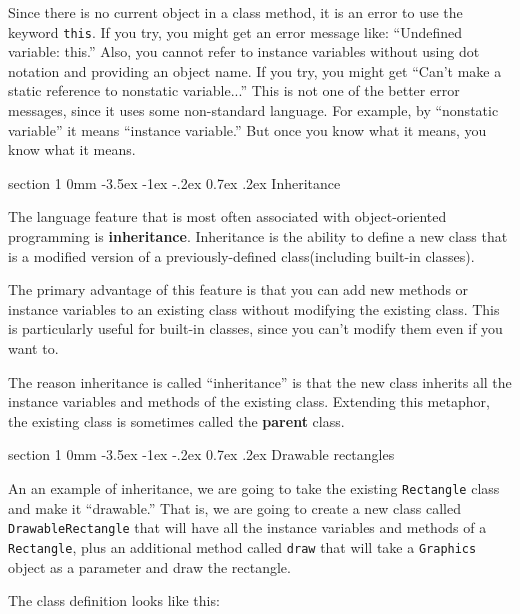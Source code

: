 \documentclass{book}
\makeatletter
\renewcommand{\section}{\@startsection 
    {section} {1} {0mm}%
    {-3.5ex \@plus -1ex \@minus -.2ex}%
    {0.7ex \@plus.2ex}%
    {\normalfont\Large\bfseries}}
\makeatother
\begin{document}

Since there is no current object in a class method, it is an
error to use the keyword {\tt this}.  If you try, you might get
an error message like: ``Undefined variable: this.''  Also, you
cannot refer to instance variables without using dot notation
and providing an object name.  If you try, you might get 
``Can't make a static reference to nonstatic variable...''
This is not one of the better error messages, since it uses
some non-standard language.  For example, by ``nonstatic
variable'' it means ``instance variable.''  But once you know
what it means, you know what it means.


\section{Inheritance}

The language feature that is most often associated with
object-oriented programming is {\bf inheritance}.  Inheritance is the
ability to define a new class that is a modified version of a
previously-defined class(including built-in classes).

The primary advantage of this feature is that you can add new methods
or instance variables to an existing class without modifying the
existing class.  This is particularly useful for built-in classes,
since you can't modify them even if you want to.

The reason inheritance is called ``inheritance'' is that the
new class inherits all the instance variables and methods
of the existing class.  Extending this metaphor, the existing
class is sometimes called the {\bf parent} class.


\section{Drawable rectangles}

An an example of inheritance, we are going to take the existing
{\tt Rectangle} class and make it ``drawable.''  That is, we are going to
create a new class called {\tt DrawableRectangle} that will have all
the instance variables and methods of a {\tt Rectangle}, plus an
additional method called {\tt draw} that will take a {\tt Graphics}
object as a parameter and draw the rectangle.

The class definition looks like this:
\end{document}
